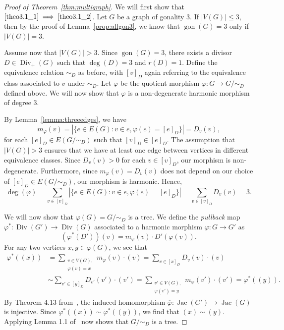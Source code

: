 \documentclass[ALCO,ThmDefs,Unicode,epreuves]{cedram}
\DeclareMathOperator{\gon}{gon}
\DeclareMathOperator{\Div}{Div}
\DeclareMathOperator{\Jac}{Jac}
\begin{document}
\begin{proof}[Proof of Theorem~\ref{thm:multigraph}]
We will first show that $\eqref{theo3.1_1} \implies \eqref{theo3.1_2}$. Let $G$ be a graph of gonality $3$. If $|V(G)| \leq 3$, then by the proof of Lemma~\ref{prop:allgon3}, we know that $\gon (G) = 3$ only if $|V(G)| = 3$. 

Assume now that $|V(G)| > 3$. Since $\gon (G)=3$, there exists a divisor $D \in \Div _+(G)$ such that $\deg (D) = 3$ and $r(D) = 1$. Define the equivalence relation $\sim_D$ as before, with $[v]_D$ again referring to the equivalence class associated to $v$ under $\sim_D$. Let $\varphi$ be the quotient morphism $\varphi : G \to G / \sim_D$ defined above. We will now show that $\varphi$ is a non-degenerate harmonic morphism of degree $3$.

By Lemma~\ref{lemma:threeedges}, we have
\[
m_\varphi(v) = | \{ e \in E(G) : v \in e, \varphi(e) = [e]_D \} | = D_{v}(v),
\]
for each $[e]_D \in E(G/\sim_D)$ such that $[v]_D \in [e]_D$. The assumption that $|V(G)| > 3$ ensures that we have at least one edge between vertices in different equivalence classes. Since $D_{v}(v) > 0$ for each $v \in [v]_D$, our morphism is non-degenerate. Furthermore, since $m_\varphi(v) = D_v(v)$ does not depend on our choice of $[e]_D \in E(G/\sim_D)$, our morphism is harmonic. Hence, 
\[
\deg (\varphi) = \sum_{v \in [v]_D} |\{ e \in E(G) : v \in e, \varphi(e) = [e]_D \}| = \sum_{v \in [v]_D} D_{v}(v) = 3.
\]



We will now show that $\varphi(G) = G / \sim_D$ is a tree. We define the \emph{pullback} map $\varphi^* : \Div (G') \to \Div (G)$ associated to a harmonic morphism $\varphi : G \to G'$ as
\[
(\varphi^*(D'))(v) = m_{\varphi}(v) \cdot D'(\varphi(v)).
\]
For any two vertices $x, y \in \varphi(G)$, we see that
\begin{align*}
 \varphi^*((x)) &= \sum_{\substack{v \in V(G), \\ \varphi(v) = x}} m_\varphi(v) \cdot (v) 
 = \sum_{v \in [x]_D} D_{v}(v) \cdot (v) 
 \\&\sim \sum_{v' \in [y]_D} D_{v'}(v') \cdot (v') 
 = \sum_{\substack{v' \in V(G), \\ \varphi(v') = y}} m_\varphi(v') \cdot (v') 
 = \varphi^*((y)).
\end{align*}
By Theorem 4.13 from~\cite{bn2}, the induced homomorphism $\overline{\varphi} : \Jac (G') \to \Jac (G)$ is injective. Since $\varphi^*((x)) \sim \varphi^*((y))$, we find that $(x) \sim (y)$. Applying Lemma 1.1 of~\cite{bn2} now shows that $G / \sim_D$ is a tree.


\end{proof}
\end{document}
